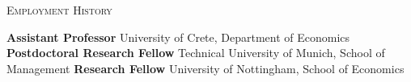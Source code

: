 \begin{rubric}{\textsc{Employment History}}

%
    \textbf{Assistant Professor} University of Crete, Department of Economics
\entry*[2020 -- 2026]%
	\textbf{Postdoctoral Research Fellow} Technical University of Munich, School of Management
%
%
\entry*[2018 -- 2020]%
	\textbf{Research Fellow} University of Nottingham, School of Economics
%
\end{rubric}
